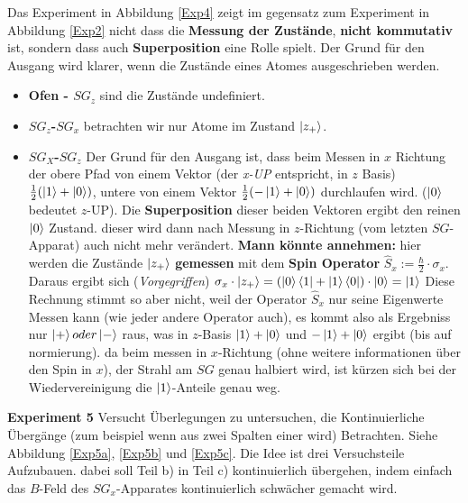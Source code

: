 \documentclass{article}
\begin{document}
\color{cyan}
Das Experiment in Abbildung \ref{Exp4} zeigt im gegensatz zum Experiment in Abbildung \ref{Exp2} nicht dass die \textbf{Messung der Zustände}, \textbf{nicht kommutativ} ist, sondern dass auch \textbf{Superposition} eine Rolle spielt.\color{gray} Der Grund für den Ausgang wird klarer, wenn die Zustände eines Atomes ausgeschrieben werden.
\begin{itemize}
  \item \textbf{Ofen - $SG_z$} sind die Zustände undefiniert.
  \item \textbf{$SG_z$-$SG_x$} betrachten wir nur Atome im Zustand $\ket{z_+}$.
  \item \textbf{$SG_X$-$SG_z$} Der Grund für den Ausgang ist, dass beim Messen in $x$ Richtung der obere Pfad von einem Vektor (der \textit{x-UP} entspricht, in $z$ Basis) $\frac{1}{2}(\ket{1}+\ket{0})$, untere von einem Vektor $\frac{1}{2}(-\ket{1}+\ket{0})$ durchlaufen wird. ($\ket{0}$ bedeutet $z$-UP). Die \textbf{Superposition} dieser beiden Vektoren ergibt den reinen $\ket{0}$ Zustand. dieser wird dann nach Messung in $z$-Richtung (vom letzten $SG$-Apparat) auch nicht mehr verändert.
  \textbf{Mann könnte annehmen:} hier werden die Zustände $\ket{z_+}$ \textbf{gemessen} mit dem \textbf{Spin Operator} $\hat{S}_x := \frac{\hbar}{2}\cdot \sigma_x$. Daraus ergibt sich (\textit{Vorgegriffen}) $\sigma_x \cdot \ket{z_+} = (\ket{0}\bra{1} + \ket{1}\bra{0}) \cdot \ket{0} = \ket{1}$ Diese Rechnung stimmt so aber nicht, weil der Operator $\hat{S}_x$ nur seine Eigenwerte Messen kann (wie jeder andere Operator auch), es kommt also als Ergebniss nur $\ket{+} oder \ket{-}$ raus, was in $z$-Basis $\ket{1}+\ket{0}$ und $-\ket{1}+\ket{0}$ ergibt (bis auf normierung). da beim messen in $x$-Richtung (ohne weitere informationen über den Spin in $x$), der Strahl am $SG$ genau halbiert wird, ist kürzen sich bei der Wiedervereinigung die $\ket{1}$-Anteile genau weg.
\end{itemize}
\color{black}

\newline


\textbf{Experiment 5} Versucht Überlegungen zu untersuchen, die Kontinuierliche Übergänge (zum beispiel wenn aus zwei Spalten einer wird) Betrachten. Siehe Abbildung \ref{Exp5a}, \ref{Exp5b} und \ref{Exp5c}. \color{cyan} Die Idee ist drei Versuchsteile Aufzubauen. dabei soll Teil b) in Teil c) kontinuierlich übergehen, indem einfach das $B$-Feld des $SG_x$-Apparates kontinuierlich schwächer gemacht wird.\color{black}
\end{document}

